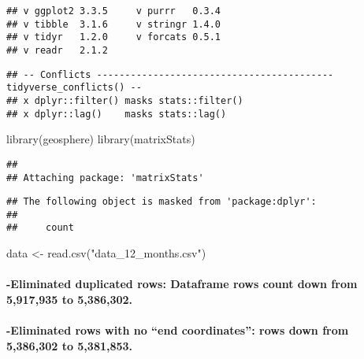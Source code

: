 \documentclass[
]{article}
\newenvironment{Shaded}{\begin{snugshade}}{\end{snugshade}}
\newcommand{\FunctionTok}[1]{\textcolor[rgb]{0.00,0.00,0.00}{#1}}
\newcommand{\NormalTok}[1]{#1}
\newcommand{\OtherTok}[1]{\textcolor[rgb]{0.56,0.35,0.01}{#1}}
\newcommand{\StringTok}[1]{\textcolor[rgb]{0.31,0.60,0.02}{#1}}
\begin{document}
\begin{verbatim}
## v ggplot2 3.3.5     v purrr   0.3.4
## v tibble  3.1.6     v stringr 1.4.0
## v tidyr   1.2.0     v forcats 0.5.1
## v readr   2.1.2
\end{verbatim}

\begin{verbatim}
## -- Conflicts ------------------------------------------ tidyverse_conflicts() --
## x dplyr::filter() masks stats::filter()
## x dplyr::lag()    masks stats::lag()
\end{verbatim}

\begin{Shaded}
\begin{Highlighting}[]
\FunctionTok{library}\NormalTok{(geosphere)}
\FunctionTok{library}\NormalTok{(matrixStats)}
\end{Highlighting}
\end{Shaded}

\begin{verbatim}
## 
## Attaching package: 'matrixStats'
\end{verbatim}

\begin{verbatim}
## The following object is masked from 'package:dplyr':
## 
##     count
\end{verbatim}

\begin{Shaded}
\begin{Highlighting}[]
\NormalTok{data }\OtherTok{\textless{}{-}} \FunctionTok{read.csv}\NormalTok{(}\StringTok{"data\_12\_months.csv"}\NormalTok{)}
\end{Highlighting}
\end{Shaded}

\hypertarget{eliminated-duplicated-rows-dataframe-rows-count-down-from-5917935-to-5386302.}{%
\paragraph{-Eliminated duplicated rows: Dataframe rows count down from
5,917,935 to
5,386,302.}\label{eliminated-duplicated-rows-dataframe-rows-count-down-from-5917935-to-5386302.}}

\hypertarget{eliminated-rows-with-no-end-coordinates-rows-down-from-5386302-to-5381853.}{%
\paragraph{-Eliminated rows with no ``end coordinates'': rows down from
5,386,302 to
5,381,853.}\label{eliminated-rows-with-no-end-coordinates-rows-down-from-5386302-to-5381853.}}
\end{document}
